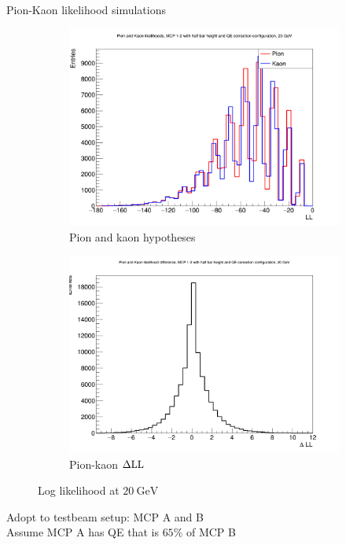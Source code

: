 \documentclass{beamer}
\begin{document}
\begin{frame}{Pion-Kaon likelihood simulations}
  \begin{figure}
    \centering
    \vspace{-0.2cm}
    \begin{subfigure}{0.5\textwidth}
      \includegraphics[width = 1.0\textwidth]{Plots/PionKaonLL20GeVStandardMCPAB.png}
      \caption{Pion and kaon hypotheses}
    \end{subfigure}%
    \begin{subfigure}{0.5\textwidth}
      \includegraphics[width = 1.0\textwidth]{Plots/PionKaonDLL20GeVStandardMCPAB.png}
      \caption{Pion-kaon $\Delta{\rm LL}$}
    \end{subfigure}
    \caption{Log likelihood at $\SI{20}{\giga\eV}$}
  \end{figure}
  \begin{center}
    Adopt to testbeam setup: MCP A and B\\
    Assume MCP A has QE that is $65\%$ of MCP B
  \end{center}
\end{frame}
\end{document}
